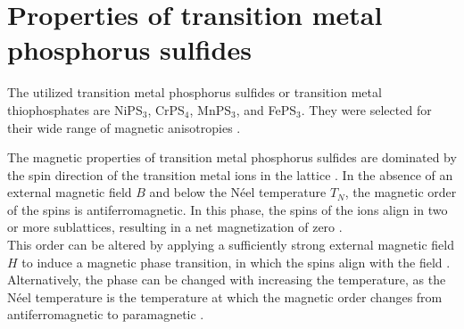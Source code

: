 \documentclass[
	twoside,
	parskip=half,
	a4paper,
]{scrbook}
\begin{document}
\section{Properties of transition metal phosphorus sulfides}
The utilized transition metal phosphorus sulfides or transition metal thiophosphates are NiPS$_3$, CrPS$_4$, MnPS$_3$, and FePS$_3$.
They were selected for their wide range of magnetic anisotropies \cite{MPS_magnetism,CrPS4_magnetic}.

The magnetic properties of transition metal phosphorus sulfides are dominated by the spin direction of the transition metal ions in the lattice \cite{MPS_magnetism}.
In the absence of an external magnetic field $B$ and below the Néel temperature $T_N$, the magnetic order of the spins is antiferromagnetic.
In this phase, the spins of the ions align in two or more sublattices, resulting in a net magnetization of zero \cite[p.195]{afm}. \\
This order can be altered by applying a sufficiently strong external magnetic field $H$ to induce a magnetic phase transition, in which the spins align with the field \cite{CrPS4_magnetic}.
Alternatively, the phase can be changed with increasing the temperature, as the Néel temperature is the temperature at which the magnetic order changes from antiferromagnetic to paramagnetic \cite{MPS_magnetism, CrPS4_magnetic}.
\end{document}

